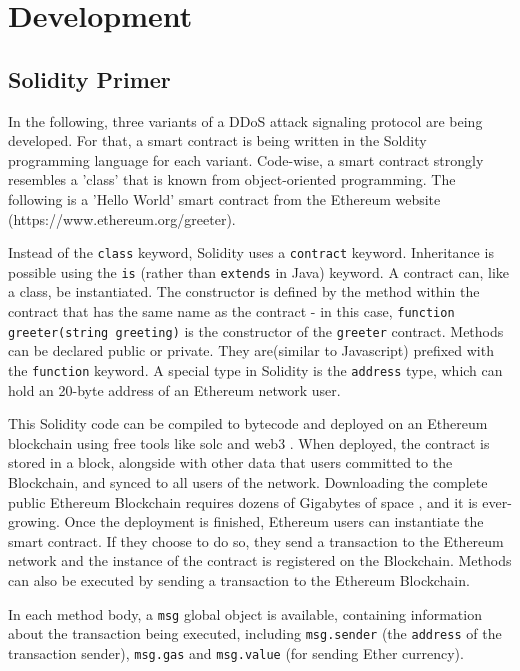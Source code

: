 \chapter{Development}

\section{Solidity Primer}

In the following, three variants of a DDoS attack signaling protocol are being developed. For that, a smart contract is being written in the Soldity programming language \cite{Solc} for each variant. Code-wise, a smart contract strongly resembles a 'class' that is known from object-oriented programming. The following is a 'Hello World' smart contract from the Ethereum website (https://www.ethereum.org/greeter).



Instead of the \texttt{class} keyword, Solidity uses a \texttt{contract} keyword. Inheritance is possible using the \texttt{is} (rather than \texttt{extends} in Java) keyword. A contract can, like a class, be instantiated. The constructor is defined by the method within the contract that has the same name as the contract - in this case, \texttt{function greeter(string greeting)} is the constructor of the \texttt{greeter} contract. Methods can be declared public or private. They are(similar to Javascript) prefixed with the \texttt{function} keyword. A special type in Solidity is the \texttt{address} type, which can hold an 20-byte address of an Ethereum network user.

This Solidity code can be compiled to bytecode and deployed on an Ethereum blockchain using free tools like solc \cite{Solc} and web3 \cite{web3}. When deployed, the contract is stored in a block, alongside with other data that users committed to the Blockchain, and synced to all users of the network. Downloading the complete public Ethereum Blockchain requires dozens of Gigabytes of space \cite{EthereumBlockchainSize}, and it is ever-growing. Once the deployment is finished, Ethereum users can instantiate the smart contract. If they choose to do so, they  send a transaction to the Ethereum network and the instance of the contract is registered on the Blockchain. Methods can also be executed by sending a transaction to the Ethereum Blockchain.

In each method body, a \texttt{msg} global object is available, containing information about the transaction being executed, including \texttt{msg.sender} (the \texttt{address} of the transaction sender), \texttt{msg.gas} and \texttt{msg.value} (for sending Ether currency).

